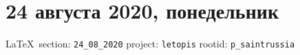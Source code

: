 
 

\section{24 августа 2020, понедельник}
\label{sec:24_08_2020}

  
\vspace{0.5cm}
 {\ifDEBUG\small\LaTeX~section: \verb|24_08_2020| project: \verb|letopis| rootid: \verb|p_saintrussia| \fi}
\vspace{0.5cm}



